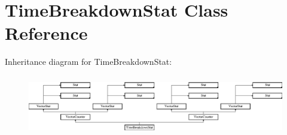 \hypertarget{classTimeBreakdownStat}{\section{Time\-Breakdown\-Stat Class Reference}
\label{classTimeBreakdownStat}
}
Inheritance diagram for Time\-Breakdown\-Stat\-:\begin{figure}[H]
\begin{center}
\leavevmode
\includegraphics[height=2.692308cm]{classTimeBreakdownStat}
\end{center}
\end{figure}
